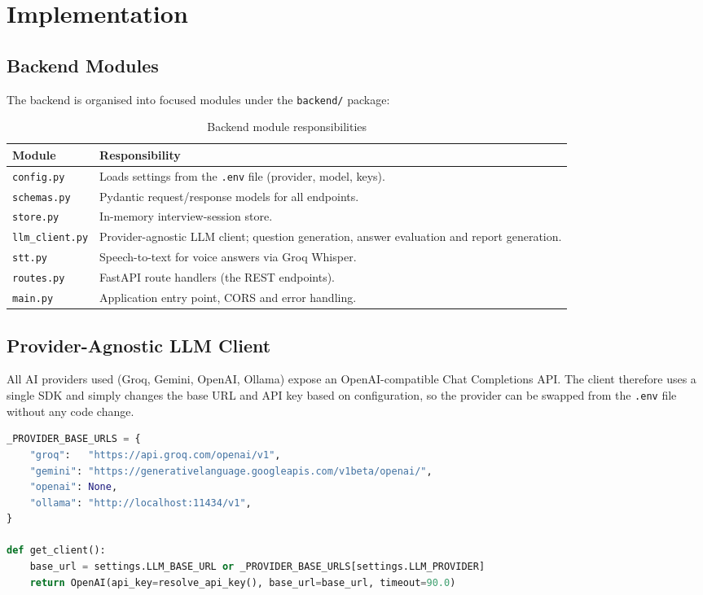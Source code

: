 \documentclass[11pt,a4paper]{article}
\newcommand{\code}[1]{\texttt{#1}}
\begin{document}
\section{Implementation}

\subsection{Backend Modules}
The backend is organised into focused modules under the \code{backend/} package:

\begin{table}[h]
\centering
\renewcommand{\arraystretch}{1.2}
\begin{tabularx}{\textwidth}{@{}l X@{}}
\toprule
\textbf{Module} & \textbf{Responsibility} \\
\midrule
\code{config.py}     & Loads settings from the \code{.env} file (provider, model, keys). \\
\code{schemas.py}    & Pydantic request/response models for all endpoints. \\
\code{store.py}      & In-memory interview-session store. \\
\code{llm\_client.py} & Provider-agnostic LLM client; question generation, answer
                        evaluation and report generation. \\
\code{stt.py}        & Speech-to-text for voice answers via Groq Whisper. \\
\code{routes.py}     & FastAPI route handlers (the REST endpoints). \\
\code{main.py}       & Application entry point, CORS and error handling. \\
\bottomrule
\end{tabularx}
\caption{Backend module responsibilities}
\end{table}

\subsection{Provider-Agnostic LLM Client}
All AI providers used (Groq, Gemini, OpenAI, Ollama) expose an OpenAI-compatible
Chat Completions API. The client therefore uses a single SDK and simply changes the
base URL and API key based on configuration, so the provider can be swapped from the
\code{.env} file without any code change.

\begin{lstlisting}[language=Python, caption={Resolving the provider endpoint (simplified)}]
_PROVIDER_BASE_URLS = {
    "groq":   "https://api.groq.com/openai/v1",
    "gemini": "https://generativelanguage.googleapis.com/v1beta/openai/",
    "openai": None,
    "ollama": "http://localhost:11434/v1",
}

def get_client():
    base_url = settings.LLM_BASE_URL or _PROVIDER_BASE_URLS[settings.LLM_PROVIDER]
    return OpenAI(api_key=resolve_api_key(), base_url=base_url, timeout=90.0)
\end{lstlisting}
\end{document}

